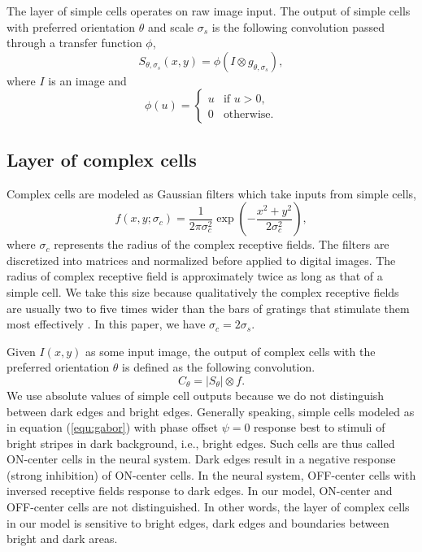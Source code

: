 \documentclass[10pt]{article}
\begin{document}
The layer of simple cells operates on raw image input. 
The output of simple cells with preferred orientation $\theta$
and scale $\sigma_s$ is the following convolution passed through a transfer function $\phi$,
\begin{equation}\label{equ:gabor}
S_{\theta,\sigma_s}(x,y)=\phi(I\otimes g_{\theta,\sigma_s}),
\end{equation}
where $I$ is an image and 
\begin{equation}\label{equ:gabor}
\phi(u)=\left\{\begin{array}{ll}
u & \text{if } u>0,\\
0 & \text{otherwise.}
\end{array}\right.
\end{equation}

\subsection{Layer of complex cells}

Complex cells are modeled as Gaussian filters which take inputs from simple cells,
\begin{equation}
f(x,y;\sigma_c)=\frac{1}{2\pi\sigma_c^2}\exp\left(-\frac{x^2+y^2}{2\sigma_c^2}\right),
\end{equation}
where $\sigma_c$ represents the radius of the complex receptive fields.
The filters are discretized into matrices and normalized before applied to digital images.
The radius of complex receptive field is approximately twice as long as that of a simple cell.
We take this size because qualitatively the complex receptive fields are usually two to five times wider 
than the bars of gratings that stimulate them most effectively \cite{movshon1978}.
In this paper, we have $\sigma_c=2\sigma_s$.

Given $I(x,y)$ as some input image, the output of complex cells
with the preferred orientation $\theta$ is defined as the following convolution.
\begin{equation}
C_{\theta}=|S_{\theta}|\otimes f.
\label{equ:complex}
\end{equation}
We use absolute values of simple cell outputs 
because we do not distinguish between dark edges and bright edges.
Generally speaking, simple cells modeled as in equation (\ref{equ:gabor}) 
with phase offset $\psi=0$ response best to stimuli of bright stripes in dark background, i.e., bright edges.
Such cells are thus called ON-center \cite{hubel1962} cells in the neural system.
Dark edges result in a negative response (strong inhibition) of ON-center cells.
In the neural system, OFF-center cells with inversed receptive fields response to dark edges.
In our model, ON-center and OFF-center cells are not distinguished.
In other words, the layer of complex cells in our model is sensitive to bright edges, dark edges 
and boundaries between bright and dark areas.
\end{document}
